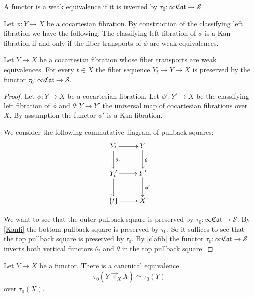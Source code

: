 \documentclass[10pt,oneside]{article}
\numberwithin{equation}{section} %
\numberwithin{figure}{section} %
\theoremstyle{plain}
\theoremstyle{definition}
\newcommand{\mS}{{\mathcal S}}
\newcommand{\fcat}{\mathfrak{Cat}}
\begin{document}
\begin{definition}
A functor is a weak equivalence if it is inverted by $\tau_0: \infty\fcat\to \mS.$
    
\end{definition}

\begin{remark}
Let $\phi: Y \to X$ be a cocartesian fibration. By construction of the
classifying left fibration we have the following:
The classifying left fibration of $\phi$ is a Kan fibration if and only if the fiber transports of $\phi$ are weak equivalences.
    
\end{remark}

\begin{proposition}\label{cocafi}

Let $Y \to X$ be a cocartesian fibration whose fiber transports are weak equivalences.
For every $t \in X $ the fiber sequence $Y_t \to Y \to X$ is preserved by the functor
$\tau_0: \infty\fcat \to \mS.$

\end{proposition}

\begin{proof}

Let $\phi: Y \to X$ be a cocartesian fibration. Let $\phi': Y' \to X$ be the classifying left fibration of $\phi$ and $\theta: Y \to Y'$
the universal map of cocartesian fibrations over $X.$
By assumption the functor $\phi'$ is a Kan fibration.

We consider the following commutative diagram of pullback squares:
$$\begin{xy}
\xymatrix{
Y_t \ar[d]^{\theta_t} \ar[r]
& Y \ar[d]^{\theta}
\\ 
Y'_t \ar[r] \ar[d] & Y' \ar[d]^{\phi'}
\\ 
\{ t \} \ar[r] & X}
\end{xy}$$	

We want to see that the outer pullback square is preserved by $\tau_0: \infty\fcat \to \mS.$
By \cref{Kanfi} the bottom pullback square is preserved by $\tau_0.$
So it suffices to see that the top pullback square is preserved by $\tau_0.$
By \cref{clafib} the functor $\tau_0: \infty\fcat \to \mS $
inverts both vertical functors $\theta_t$ and $\theta$ in the top pullback square.
\end{proof}

\begin{proposition}\label{envlemo}Let $Y \to X$ be a functor. There is a canonical equivalence 
$$ \tau_0(Y \,{\vec{\times}}_X X) \simeq \tau_0(Y)$$ over $\tau_0(X).$

\end{proposition}
\end{document}
